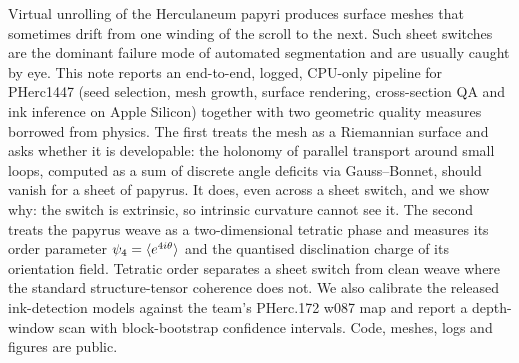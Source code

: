 Virtual unrolling of the Herculaneum papyri produces surface meshes that sometimes drift from one winding of the scroll to the next. Such sheet switches are the dominant failure mode of automated segmentation and are usually caught by eye. This note reports an end-to-end, logged, CPU-only pipeline for PHerc1447 (seed selection, mesh growth, surface rendering, cross-section QA and ink inference on Apple Silicon) together with two geometric quality measures borrowed from physics. The first treats the mesh as a Riemannian surface and asks whether it is developable: the holonomy of parallel transport around small loops, computed as a sum of discrete angle deficits via Gauss--Bonnet, should vanish for a sheet of papyrus. It does, even across a sheet switch, and we show why: the switch is extrinsic, so intrinsic curvature cannot see it. The second treats the papyrus weave as a two-dimensional tetratic phase and measures its order parameter $\psi_4=\langle e^{4i\theta}\rangle$ and the quantised disclination charge of its orientation field. Tetratic order separates a sheet switch from clean weave where the standard structure-tensor coherence does not. We also calibrate the released ink-detection models against the team's PHerc.172 w087 map and report a depth-window scan with block-bootstrap confidence intervals. Code, meshes, logs and figures are public.
